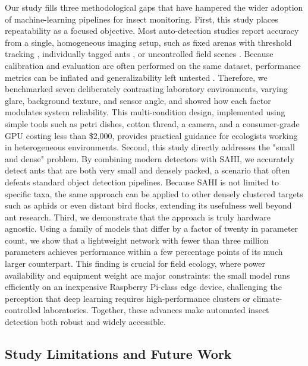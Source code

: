 Our study fills three methodological gaps that have hampered the wider adoption of machine-learning pipelines for insect monitoring. First, this study places repeatability as a focused objective. Most auto-detection studies report accuracy from a single, homogeneous imaging setup, such as fixed arenas with threshold tracking \citep{cartas_ayala_behavior_2016,xu_segmentation_2022,sabattini_anttracker_2023}, individually tagged ants \citep{sclocco_integrating_2021}, or uncontrolled field scenes \citep{zhang_aphid_2023,grijalva_detecting_2024}. Because calibration and evaluation are often performed on the same dataset, performance metrics can be inflated and generalizability left untested \citep{chen_common_2025}. Therefore, we benchmarked seven deliberately contrasting laboratory environments, varying glare, background texture, and sensor angle, and showed how each factor modulates system reliability. This multi-condition design, implemented using simple tools such as petri dishes, cotton thread, a camera, and a consumer-grade GPU costing less than \$2,000, provides practical guidance for ecologists working in heterogeneous environments.
Second, this study directly addresses the "small and dense" problem. By combining modern detectors with SAHI, we accurately detect ants that are both very small and densely packed, a scenario that often defeats standard object detection pipelines. Because SAHI is not limited to specific taxa, the same approach can be applied to other densely clustered targets such as aphids \citep{xu_segmentation_2022,zhang_aphid_2023,grijalva_detecting_2024} or even distant bird flocks, extending its usefulness well beyond ant research.
Third, we demonstrate that the approach is truly hardware agnostic. Using a family of models that differ by a factor of twenty in parameter count, we show that a lightweight network with fewer than three million parameters achieves performance within a few percentage points of its much larger counterpart. This finding is crucial for field ecology, where power availability and equipment weight are major constraints: the small model runs efficiently on an inexpensive Raspberry Pi-class edge device, challenging the perception that deep learning requires high-performance clusters or climate-controlled laboratories. Together, these advances make automated insect detection both robust and widely accessible.

\subsection{Study Limitations and Future Work}

